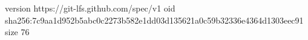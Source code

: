version https://git-lfs.github.com/spec/v1
oid sha256:7c9aa1d952b5abc0c2273b582e1dd03d135621a0c59b32336e4364d1303eec91
size 76
